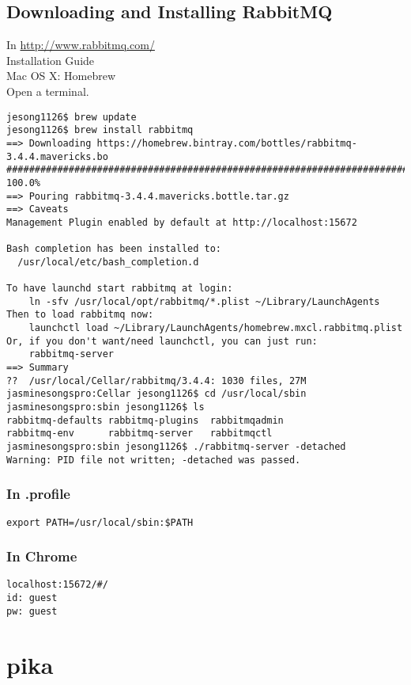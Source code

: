 \documentclass[10pt]{article}
\begin{document}
\subsection{Downloading and Installing RabbitMQ} 
In \href{http://www.rabbitmq.com/}{http://www.rabbitmq.com/} \\
Installation Guide \\
Mac OS X: Homebrew \\
Open a terminal.  
\begin{verbatim} 
jesong1126$ brew update 
jesong1126$ brew install rabbitmq 
==> Downloading https://homebrew.bintray.com/bottles/rabbitmq-3.4.4.mavericks.bo
######################################################################## 100.0%
==> Pouring rabbitmq-3.4.4.mavericks.bottle.tar.gz
==> Caveats
Management Plugin enabled by default at http://localhost:15672

Bash completion has been installed to:
  /usr/local/etc/bash_completion.d

To have launchd start rabbitmq at login:
    ln -sfv /usr/local/opt/rabbitmq/*.plist ~/Library/LaunchAgents
Then to load rabbitmq now:
    launchctl load ~/Library/LaunchAgents/homebrew.mxcl.rabbitmq.plist
Or, if you don't want/need launchctl, you can just run:
    rabbitmq-server
==> Summary
??  /usr/local/Cellar/rabbitmq/3.4.4: 1030 files, 27M
jasminesongspro:Cellar jesong1126$ cd /usr/local/sbin
jasminesongspro:sbin jesong1126$ ls
rabbitmq-defaults rabbitmq-plugins  rabbitmqadmin
rabbitmq-env      rabbitmq-server   rabbitmqctl
jasminesongspro:sbin jesong1126$ ./rabbitmq-server -detached
Warning: PID file not written; -detached was passed.
\end{verbatim}

\subsubsection{In .profile} 
\begin{verbatim} 
export PATH=/usr/local/sbin:$PATH
\end{verbatim}

\subsubsection{In Chrome}
\begin{verbatim} 
localhost:15672/#/
id: guest
pw: guest 
\end{verbatim}

\section{pika} \label{sec:pika} 
\end{document}
